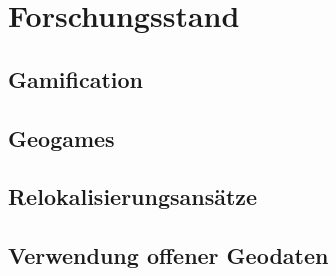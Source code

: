 \section{Forschungsstand}
\label{sec:S3_Forschungsstand}

\subsection{Gamification}

\subsection{Geogames}

\subsection{Relokalisierungsansätze}

\subsection{Verwendung offener Geodaten}